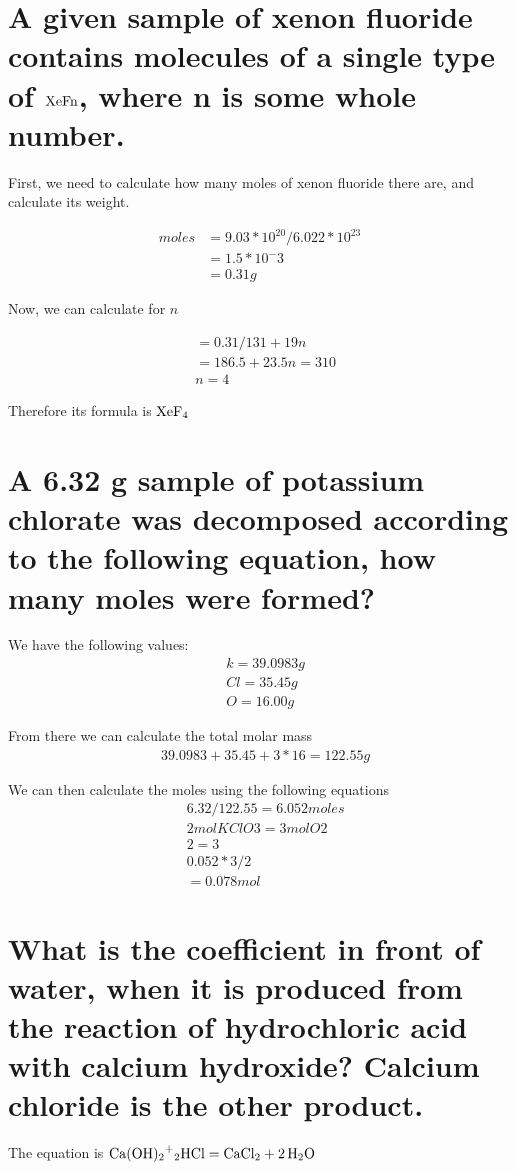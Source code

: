 \documentclass{scrartcl}
\begin{document}
\section{A given sample of xenon fluoride contains molecules of a single type of \(\ce{XeFn}\), where n is some whole number.}
\label{sec:orge42c876}
First, we need to calculate how many moles of xenon fluoride there are, and
calculate its weight.

\begin{align*}
moles&=9.03*10^{20}/6.022*10^{23}\\
&= 1.5*10^-3\\
&= 0.31g
\end{align*}

Now, we can calculate for \(n\)

\begin{align*}
&= 0.31/131+19n\\
&= 186.5 + 23.5n = 310\\
&n = 4
\end{align*}

Therefore its formula is \(\ce{XeF4}\)

\section{A 6.32 g sample of potassium chlorate was decomposed according to the following equation, how many moles were formed?}
\label{sec:org9f054b6}
We have the following values:
\begin{align*}
&k = 39.0983g\\
&Cl = 35.45g\\
&O = 16.00g
\end{align*}

From there we can calculate the total molar mass
\begin{align*}
&39.0983 + 35.45 + 3*16 = 122.55g
\end{align*}

We can then calculate the moles using the following equations
\begin{align*}
&6.32/122.55 = 6.052 moles\\
&2 mol KClO3 = 3 mol O2\\
&2 = 3\\
&0.052*3/2\\
&= 0.078 mol
\end{align*}

\section{What is the coefficient in front of water, when it is produced from the reaction of hydrochloric acid with calcium hydroxide? Calcium chloride is the other product.}
\label{sec:org5d874bd}
The equation is
\(\ce{Ca(OH)2+2HCl}=\ce{CaCl2 + 2H2O}\)
\end{document}
